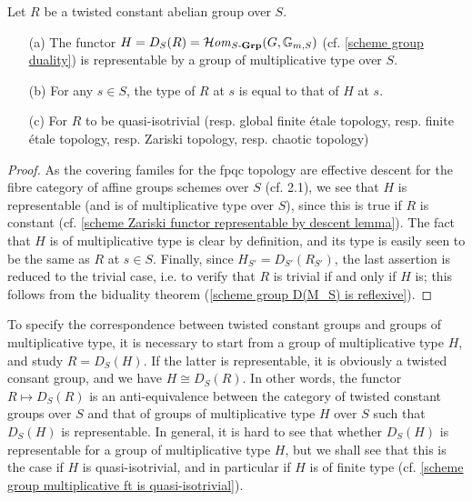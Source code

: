 \begin{proposition}\label{scheme twisted constant abelian duality prop}
Let $R$ be a twisted constant abelian group over $S$.
\begin{enumerate}
    \item[(a)] The functor $H=D_S(R)=\operatorname{\mathcal{H}\hspace*{-0.4pt}\textit{om}\hspace{0.5pt}}_{S\textup{-}\mathbf{Grp}}(G,\mathbb{G}_{m,S})$ (cf. \autoref{scheme group duality}) is representable by a group of multiplicative type over $S$.
    \item[(b)] For any $s\in S$, the type of $R$ at $s$ is equal to that of $H$ at $s$.
    \item[(c)] For $R$ to be quasi-isotrivial (resp. global finite \'etale topology, resp. finite \'etale topology, resp. Zariski topology, resp. chaotic topology)
\end{enumerate}
\end{proposition}
\begin{proof}
As the covering familes for the fpqc topology are effective descent for the fibre category of affine groups schemes over $S$ (cf. \cite{SGA1}  2.1), we see that $H$ is representable (and is of multiplicative type over $S$), since this is true if $R$ is constant (cf. \cref{scheme Zariski functor representable by descent lemma}). The fact that $H$ is of multiplicative type is clear by definition, and its type is easily seen to be the same as $R$ at $s\in S$. Finally, since $H_{S'}=D_{S'}(R_{S'})$, the last assertion is reduced to the trivial case, i.e. to verify that $R$ is trivial if and only if $H$ is; this follows from the biduality theorem (\cref{scheme group D(M_S) is reflexive}).
\end{proof}

To specify the correspondence between twisted constant groups and groups of multiplicative type, it is necessary to start from a group of multiplicative type $H$, and study $R=D_S(H)$. If the latter is representable, it is obviously a twisted consant group, and we have $H\cong D_S(R)$. In other words, the functor $R\mapsto D_S(R)$ is an anti-equivalence between the category of twisted constant groups over $S$ and that of groups of multiplicative type $H$ over $S$ such that $D_S(H)$ is representable. In general, it is hard to see that whether $D_S(H)$ is representable for a group of multiplicative type $H$, but we shall see that this is the case if $H$ is quasi-isotrivial, and in particular if $H$ is of finite type (cf. \cref{scheme group multiplicative ft is quasi-isotrivial}).

